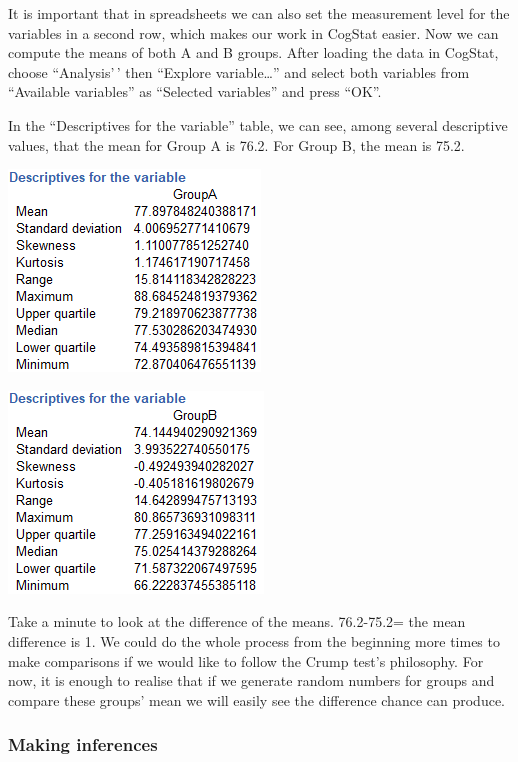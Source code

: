 \documentclass[
]{book}
\begin{document}
It is important that in spreadsheets we can also set the measurement level for the variables in a second row, which makes our work in CogStat easier. Now we can compute the means of both A and B groups. After loading the data in CogStat, choose ``Analysis'\,' then ``Explore variable\ldots{}'' and select both variables from ``Available variables'' as ``Selected variables'' and press ``OK''.

In the ``Descriptives for the variable'' table, we can see, among several descriptive values, that the mean for Group A is 76.2. For Group B, the mean is 75.2.

\includegraphics{img/ch5/5.3.2groupAdescr.png}

\includegraphics{img/ch5/5.3.2groupBdescr.png}

Take a minute to look at the difference of the means. 76.2-75.2= the mean difference is 1. We could do the whole process from the beginning more times to make comparisons if we would like to follow the Crump test's philosophy. For now, it is enough to realise that if we generate random numbers for groups and compare these groups' mean we will easily see the difference chance can produce.

\hypertarget{making-inferences}{%
\subsubsection{Making inferences}\label{making-inferences}}
\end{document}

